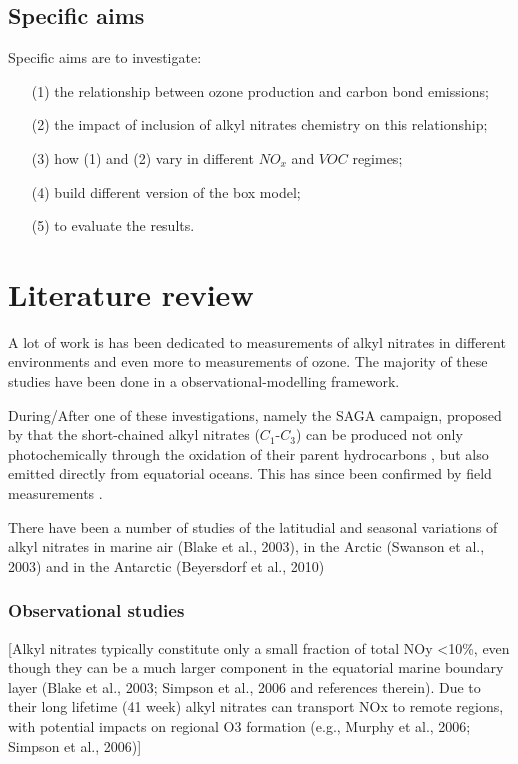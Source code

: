 \documentclass[11pt,a4paper]{article}
\begin{document}
\subsection{Specific aims}
Specific aims are to investigate:
\begin{itemize}
\item[(1)] the relationship between ozone production and carbon bond emissions;
\item[(2)] the impact of inclusion of alkyl nitrates chemistry on this relationship;
\item[(3)] how (1) and (2) vary in different $NO_x$ and $VOC$ regimes;
\item[(4)] build different version of the box model;
\item[(5)] to evaluate the results.
\end{itemize}

\section{Literature review} \label{sec:lit_review}
A lot of work is has been dedicated to measurements of alkyl nitrates in different environments and even more to measurements of ozone. The majority of these studies have been done in a observational-modelling framework.

During/After one of these investigations, namely the SAGA campaign, \citep{Atlas1993} proposed by that the short-chained alkyl nitrates ($C_1$-$C_3$) can be produced not only photochemically through the oxidation of their parent hydrocarbons \citep{Roberts1990}, but also emitted directly from equatorial oceans. This has since been
confirmed by field measurements \citep{Chuck2002,Blake2003,Dalh2005}.

There have been a number of studies of the latitudial and seasonal variations of alkyl nitrates in marine air (Blake et al., 2003), in the Arctic (Swanson et al., 2003) and in the
Antarctic (Beyersdorf et al., 2010)
\subsubsection{Observational studies}

\citep{Sommariva2008}
[Alkyl nitrates typically constitute only a small
fraction of total NOy <10\%, even though they can be a much larger component in the equatorial marine boundary layer (Blake et al., 2003; Simpson et al., 2006 and references therein). Due to their long lifetime (41 week) alkyl nitrates can transport NOx to remote regions, with potential impacts on regional O3 formation (e.g., Murphy et al., 2006; Simpson et al., 2006)]
\end{document}
